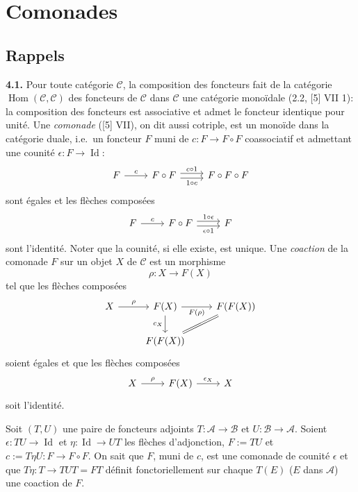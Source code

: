 \documentclass[12pt,a4paper]{article}
\theoremstyle{plain}
\theoremstyle{definition}
\theoremstyle{remark}
\DeclareMathOperator{\Hom}{Hom}
\DeclareMathOperator{\Id}{Id}
\begin{document}
\section{Comonades}

\subsection{Rappels}

\textbf{4.1.} Pour toute catégorie $\mathcal{C}$, la composition des foncteurs fait de la catégorie $\Hom(\mathcal{C},\mathcal{C})$ des foncteurs de $\mathcal{C}$ dans $\mathcal{C}$ une catégorie monoïdale (2.2, [5] VII 1): la composition des foncteurs est associative et admet le foncteur identique pour unité. Une \emph{comonade} ([5] VII), on dit aussi cotriple, est un monoïde dans la catégorie duale, i.e.~un foncteur $F$ muni de $c : F \to F \circ F$ coassociatif et admettant une counité $\epsilon : F \to \Id$:
\[
\begin{tikzcd}
F \arrow[r, "c"] & F \circ F \arrow[r, shift left, "c \circ 1"] \arrow[r, shift right, "1 \circ c"'] & F \circ F \circ F
\end{tikzcd}
\]
sont égales et les flèches composées
\[
\begin{tikzcd}
F \arrow[r, "c"] & F \circ F \arrow[r, "\epsilon \circ 1"', shift right] \arrow[r, "1 \circ \epsilon", shift left] & F
\end{tikzcd}
\]
sont l'identité. Noter que la counité, si elle existe, est unique. Une \emph{coaction} de la comonade $F$ sur un objet $X$ de $\mathcal{C}$ est un morphisme
\[
\rho : X \to F(X)
\]
tel que les flèches composées
\[
\begin{tikzcd}
X \arrow[r, "\rho"] & F(X) \arrow[r, "F(\rho)"'] \arrow[d, "c_X"'] & F(F(X)) \\
& F(F(X)) \arrow[ru, equal]
\end{tikzcd}
\]
soient égales et que les flèches composées
\[
\begin{tikzcd}
X \arrow[r, "\rho"] & F(X) \arrow[r, "\epsilon_X"] & X
\end{tikzcd}
\]
soit l'identité.

Soit $(T,U)$ une paire de foncteurs adjoints $T : \mathcal{A} \to \mathcal{B}$ et $U : \mathcal{B} \to \mathcal{A}$. Soient $\epsilon : TU \to \Id$ et $\eta : \Id \to UT$ les flèches d'adjonction, $F := TU$ et $c := T\eta U : F \to F \circ F$. On sait que $F$, muni de $c$, est une comonade de counité $\epsilon$ et que $T\eta : T \to TUT = FT$ définit fonctoriellement sur chaque $T(E)$ ($E$ dans $\mathcal{A}$) une coaction de $F$.
\end{document}
